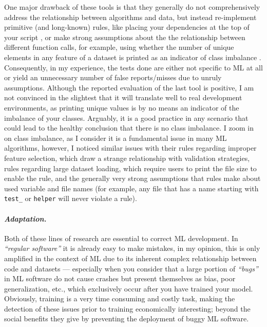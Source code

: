     One major drawback of these tools is that they generally do not comprehensively address the relationship between algorithms and data, but instead re-implement primitive (and long-known) rules, like placing your dependencies at the top of your script \citep{quaranta2024pynblint}, or make strong assumptions about the the relationship between different function calls, for example, using whether the number of unique elements in any feature of a dataset is printed as an indicator of class imbalance \citep{shivashankar2025mlscent}.
    Consequently, in my experience, the tests done are either not specific to ML at all or yield an unnecessary number of false reports/misses due to unruly assumptions.
    Although the reported evaluation of the last tool is positive, I am not convinced in the slightest that it will translate well to real development environments, as printing unique values is by no means an indicator of the imbalance of your classes.
    Arguably, it is a good practice in any scenario that could lead to the healthy conclusion that there is no class imbalance.
    I zoom in on class imbalance, as I consider it is a fundamental issue in many ML algorithms, however, I noticed similar issues with their rules regarding improper feature selection, which draw a strange relationship with validation strategies, rules regarding large dataset loading, which require users to print the file size to enable the rule, and the generally very strong assumptions that rules make about used variable and file names (for example, any file that has a name starting with \texttt{test\_} or \texttt{helper} will never violate a rule).
    
    \paragraph{\textit{Adaptation.}} Both of these lines of research \citep{recupito2024unmasking, shivashankar2025mlscent} are essential to correct ML development.
    In \textit{``regular software''} it is already easy to make mistakes, in my opinion, this is only amplified in the context of ML due to its inherent complex relationship between code and datasets --- especially when you consider that a large portion of \textit{``bugs''} in ML software do not cause crashes but present themselves as bias, poor generalization, etc., which exclusively occur after you have trained your model.
    Obviously, training is a very time consuming and costly task, making the detection of these issues prior to training economically interesting; beyond the social benefits they give by preventing the deployment of buggy ML software.


